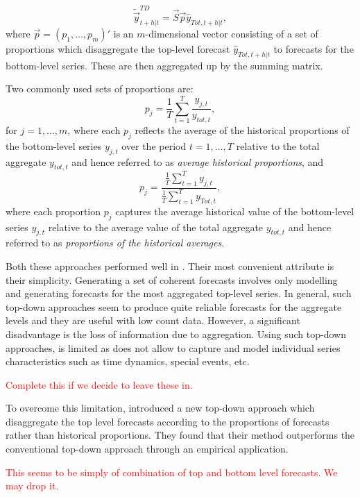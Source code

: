 \documentclass[graybox]{svmult}
\begin{document}
\begin{equation*}
\tilde{\vec{y}}^{TD}_{t+h|t}=\vec{S}\vec{p}\hat{y}_{Tot, t+h|t},
\end{equation*}
where $\vec{p} = (p_1,...,p_m)'$ is an $m$-dimensional vector consisting of a set of proportions which disaggregate the top-level forecast $\hat{y}_{Tot, t+h|t}$ to forecasts for the bottom-level series. These are then aggregated up by the summing matrix.

Two commonly used sets of proportions are:
\begin{equation*}
p_j = \frac{1}{T} \sum_{t=1}^{T}\frac{y_{j,t}}{y_{tot,t}},
\end{equation*}
for $j=1,\ldots,m$, where each $p_j$ reflects the average of the historical proportions of the bottom-level series $y_{j,t}$ over the period $t=1,\ldots,T$ relative to the total aggregate $y_{tot,t}$ and hence referred to as \textit{average historical proportions}, and
\begin{equation}
p_j = \frac{\frac{1}{T}\sum_{t=1}^{T}y_{j,t}}{\frac{1}{T}\sum_{t=1}^{T}y_{Tot,t}},
\end{equation}
where each proportion $p_j$ captures the average historical value of the bottom-level series $y_{j,t}$ relative to the average value of the total aggregate $y_{tot,t}$ and hence referred to as \textit{proportions of the historical averages}.

Both these approaches performed well in \cite{gross1990}. Their most convenient attribute is their simplicity. Generating a set of coherent forecasts involves only modelling and generating forecasts for the most aggregated top-level series. In general, such top-down approaches seem to produce quite reliable forecasts for the aggregate levels and they are useful with low count data. However, a significant disadvantage is the loss of information due to aggregation. Using such top-down approaches, is limited as does not allow to capture and model individual series characteristics such as time dynamics, special events, etc.

\textcolor{red}{Complete this if we decide to leave these in.}

To overcome this limitation, \cite{AthEtAl2009} introduced a new top-down approach which disaggregate the top level forecasts according to the proportions of forecasts rather than historical proportions. They found that their method outperforms the conventional top-down approach through an empirical application.

\textcolor{red}{This seems to be simply of combination of top and bottom level forecasts. We may drop it. }
\end{document}
